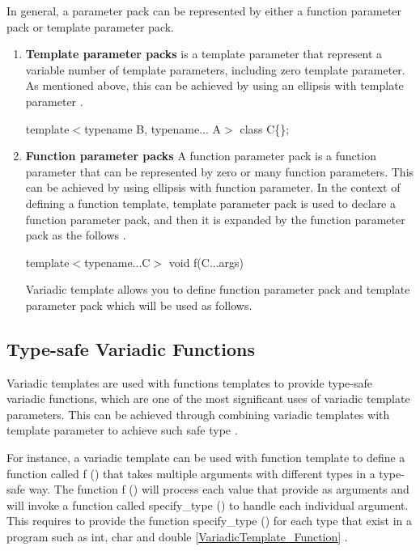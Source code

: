 \documentclass[11pt]{report}
\begin{document}
In general, a parameter pack can be represented by either a function parameter pack or template parameter pack.

\begin{enumerate}
\item \textbf{Template parameter packs} is a template parameter that represent a variable number of template parameters, including zero template parameter.  As mentioned above, this can be achieved by using an ellipsis with template parameter \cite{Gregorie:professionalcpp}.
\begin{center}
template$<$typename B, typename... A$>$ class C\{\}; 
\end{center}


\item \textbf{Function parameter packs} A function parameter pack is a function parameter that can be represented by zero or many function parameters. This can be achieved by using ellipsis with function parameter. In the context of defining a function template, template parameter pack is used to declare a function parameter pack, and then it is expanded by the function parameter pack as the follows \cite{Gregorie:professionalcpp}.
\begin{center}
template$<$typename...C$>$ void f(C...args)
\end{center}

Variadic template allows you to define function parameter pack and template parameter pack which will be used as follows.

\end{enumerate}

\subsection{Type-safe Variadic Functions}
Variadic templates are used with functions templates to provide type-safe variadic functions, which are one of the most significant uses of variadic template parameters. This can be achieved through combining variadic templates with template parameter to achieve such safe type \cite{Gregor:2007:VTC}.


For instance, a variadic template can be used with function template to define a function called f () that takes multiple arguments with different types in a type-safe way. The function f () will process each value that provide as arguments and will invoke a function called specify\_type () to handle each individual argument. This requires to provide the function specify\_type () for each type that exist in a program such as int, char and double \ref{VariadicTemplate_Function} \cite{Gregorie:professionalcpp}.
\end{document}
